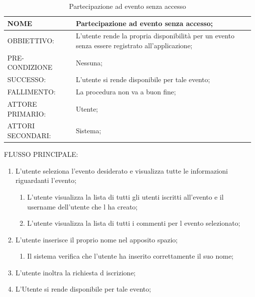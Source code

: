 \begin{table}[H]
\begin{tabular}{p{}|p{}}
\toprule
NOME & Partecipazione ad evento senza accesso;\\
\hline
OBBIETTIVO: & L'utente rende la propria disponibilità per un evento senza essere registrato all'applicazione;\\
\hline
PRE-CONDIZIONE & Nessuna;\\
\hline
SUCCESSO: & L'utente si rende disponibile per tale evento;\\
	\hline
FALLIMENTO: & La procedura non va a buon fine;\\
\hline
ATTORE PRIMARIO: & Utente;\\
\hline
ATTORI SECONDARI: & Sistema;\\
\bottomrule
\end{tabular}
\caption{Partecipazione ad evento senza accesso}
\label{table:parSA}
\end{table}
FLUSSO PRINCIPALE:
\begin{enumerate}
\item L'utente seleziona l'evento desiderato e visualizza tutte le informazioni riguardanti l'evento;
\begin{enumerate}
\item L'utente visualizza la lista di tutti gli utenti iscritti all'evento e il username dell'utente che l ha creato;
\item L'utente visualizza la lista di tutti i commenti per l evento selezionato;
\end{enumerate}
\item L'utente inserisce il proprio nome nel apposito spazio;
\begin{enumerate}
\item Il sistema verifica che l'utente ha inserito correttamente il suo nome;
\end{enumerate}
\item L'utente inoltra la richiesta d iscrizione;
\item L'Utente si rende disponibile per tale evento;
\end{enumerate}

